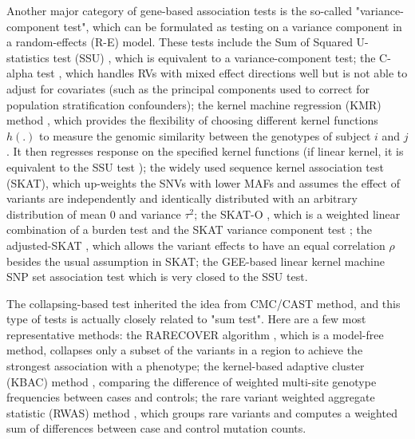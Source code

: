 \documentclass[12pt]{article}
\begin{document}
Another major category of gene-based association tests is the so-called "variance-component test", which can be formulated as testing on a variance component in a random-effects (R-E) model. These tests include the Sum of Squared U-statistics test (SSU) \cite{Pan2009}, which is equivalent to a variance-component test; the C-alpha test \cite{Neale2011}, which handles RVs with mixed effect directions well but is not able to adjust for covariates (such as the principal components used to correct for population stratification confounders); the kernel machine regression (KMR) method \cite{Wu2010,Kwee2008}, which provides the flexibility of choosing different kernel functions $h(.)$ to measure the genomic similarity between the genotypes of subject $i$ and $j$. It then regresses response on the specified kernel functions (if linear kernel, it is equivalent to the SSU test \cite{Pan2009}); the widely used sequence kernel association test (SKAT)\cite{Wu2011}, which up-weights the SNVs with lower MAFs and assumes the effect of variants are independently and identically distributed with an arbitrary distribution of mean 0 and variance $\tau^2$; the SKAT-O \cite{Lee2012a,Lee2012}, which is a weighted linear combination of a burden test and the SKAT variance component test%
; the adjusted-SKAT \cite{Oualkacha2013}, which allows the variant effects to have an equal correlation $\rho$ besides the usual assumption in SKAT; the GEE-based linear kernel machine SNP set association test \cite{Wang2013} which is very closed to the SSU test.

The collapsing-based test inherited the idea from CMC/CAST method, and this type of tests is actually closely related to "sum test". Here are a few most representative methods: the RARECOVER algorithm \cite{Bhatia2010}, which is a model-free method, collapses only a subset of the variants in a region to achieve the strongest association with a phenotype; the kernel-based adaptive cluster (KBAC) method \cite{Liu2010}, comparing the difference of weighted multi-site genotype frequencies between cases and controls; the rare variant weighted aggregate statistic (RWAS) method \cite{Sul2011}, which groups rare variants and computes a weighted sum of differences between case and control mutation counts.  
\end{document}

